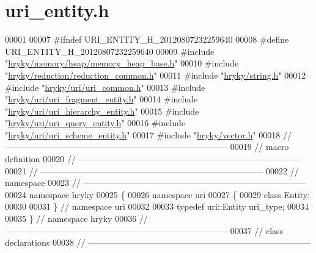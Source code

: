 \hypertarget{uri__entity_8h_source}{\section{uri\-\_\-entity.\-h}
}

\begin{DoxyCode}
00001 
00007 \textcolor{preprocessor}{#ifndef URI\_ENTITY\_H\_20120807232259640}
00008 \textcolor{preprocessor}{}\textcolor{preprocessor}{#define URI\_ENTITY\_H\_20120807232259640}
00009 \textcolor{preprocessor}{}\textcolor{preprocessor}{#include "\hyperlink{memory__heap__base_8h}{hryky/memory/heap/memory_heap_base.h}"}
00010 \textcolor{preprocessor}{#include "\hyperlink{reduction__common_8h}{hryky/reduction/reduction_common.h}"}
00011 \textcolor{preprocessor}{#include "\hyperlink{string_8h}{hryky/string.h}"}
00012 \textcolor{preprocessor}{#include "\hyperlink{uri__common_8h}{hryky/uri/uri_common.h}"}
00013 \textcolor{preprocessor}{#include "\hyperlink{uri__fragment__entity_8h}{hryky/uri/uri_fragment_entity.h}"}
00014 \textcolor{preprocessor}{#include "\hyperlink{uri__hierarchy__entity_8h}{hryky/uri/uri_hierarchy_entity.h}"}
00015 \textcolor{preprocessor}{#include "\hyperlink{uri__query__entity_8h}{hryky/uri/uri_query_entity.h}"}
00016 \textcolor{preprocessor}{#include "\hyperlink{uri__scheme__entity_8h}{hryky/uri/uri_scheme_entity.h}"}
00017 \textcolor{preprocessor}{#include "\hyperlink{vector_8h}{hryky/vector.h}"}
00018 \textcolor{comment}{//
      ------------------------------------------------------------------------------}
00019 \textcolor{comment}{// macro definition}
00020 \textcolor{comment}{//
      ------------------------------------------------------------------------------}
00021 \textcolor{comment}{//
      ------------------------------------------------------------------------------}
00022 \textcolor{comment}{// namespace}
00023 \textcolor{comment}{//
      ------------------------------------------------------------------------------}
00024 \textcolor{keyword}{namespace }hryky
00025 \{
00026 \textcolor{keyword}{namespace }uri
00027 \{
00029     \textcolor{keyword}{class }Entity;
00030 
00031 \} \textcolor{comment}{// namespace uri}
00032 
00033 \textcolor{keyword}{typedef} uri::Entity uri\_type;
00034 
00035 \} \textcolor{comment}{// namespace hryky}
00036 \textcolor{comment}{//
      ------------------------------------------------------------------------------}
00037 \textcolor{comment}{// class declarations}
00038 \textcolor{comment}{//
      ------------------------------------------------------------------------------}

\end{DoxyCode}
